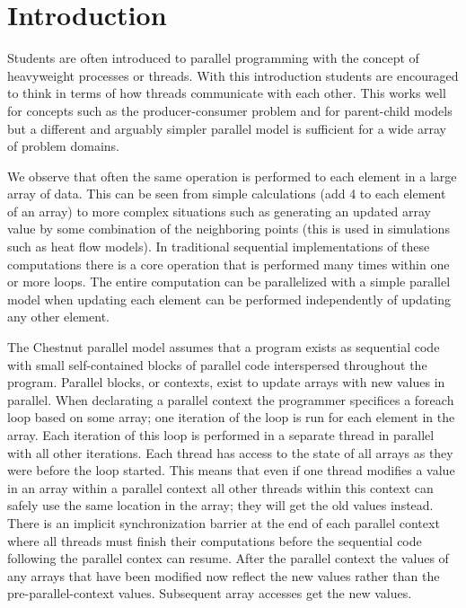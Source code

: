 
\section{Introduction}

Students are often introduced to parallel programming with the concept of
heavyweight processes or threads. With this introduction students are
encouraged to think in terms of how threads communicate with each other. This
works well for concepts such as the producer-consumer problem and for
parent-child models but a different and arguably simpler parallel model is
sufficient for a wide array of problem domains.

We observe that often the same operation is performed to each element in a
large array of data. This can be seen from simple calculations (add 4 to each
element of an array) to more complex situations such as generating an updated
array value by some combination of the neighboring points (this is used in
simulations such as heat flow models). In traditional sequential
implementations of these computations there is a core operation that is
performed many times within one or more loops. The entire computation can be
parallelized with a simple parallel model when updating each element can be
performed independently of updating any other element.

The Chestnut parallel model assumes that a program exists as sequential code
with small self-contained blocks of parallel code interspersed throughout the
program. Parallel blocks, or contexts, exist to update arrays with new values
in parallel. When declarating a parallel context the programmer specifices a
foreach loop based on some array; one iteration of the loop is run for each
element in the array. Each iteration of this loop is performed in a separate
thread in parallel with all other iterations. Each thread has access to the
state of all arrays as they were before the loop started. This means that even
if one thread modifies a value in an array within a parallel context all other
threads within this context can safely use the same location in the array; they
will get the old values instead. There is an implicit synchronization barrier
at the end of each parallel context where all threads must finish their
computations before the sequential code following the parallel contex can
resume. After the parallel context the values of any arrays that have been
modified now reflect the new values rather than the pre-parallel-context
values. Subsequent array accesses get the new values.

